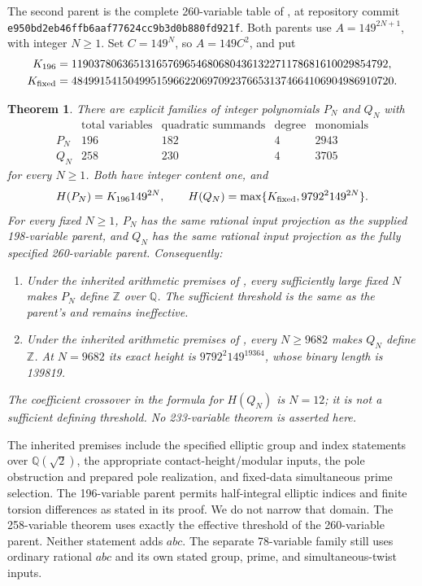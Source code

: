 \documentclass[11pt,a4paper]{article}
\newtheorem{theorem}{Theorem}[section]\newtheorem{lemma}[theorem]{Lemma}\newtheorem{proposition}[theorem]{Proposition}\newtheorem{corollary}[theorem]{Corollary}
\newcommand{\Q}{\mathbb Q}\newcommand{\Z}{\mathbb Z}\newcommand{\Nm}{\operatorname{N}}
\begin{document}
The second parent is the complete 260-variable table of \cite{Explicit}, at
repository commit \texttt{e950bd2eb46ffb6aaf77624cc9b3d0b880fd921f}.
Both parents use $A=149^{2N+1}$, with integer $N\ge1$.
Set $C=149^N$, so $A=149C^2$, and put
\begin{align*}
 K_{196}&=11903780636513165769654680680436132271178681610029854792,\\
 K_{\rm fixed}&=484991541504995159662206970923766531374664106904986910720.
\end{align*}

\begin{theorem}\label{thm:results}
There are explicit families of integer polynomials $P_N$ and $Q_N$ with
\[
\begin{array}{c|r|r|r|r}
 &\text{total variables}&\text{quadratic summands}&\text{degree}&\text{monomials}\\\hline
P_N&196&182&4&2943\\
Q_N&258&230&4&3705
\end{array}
\]
for every $N\ge1$. Both have integer content one, and
\[
 H(P_N)=K_{196}149^{2N},\qquad
 H(Q_N)=\max\{K_{\rm fixed},9792^2 149^{2N}\}.
\]
For every fixed $N\ge1$, $P_N$ has the same rational input projection as
the supplied 198-variable parent, and $Q_N$ has the same rational input
projection as the fully specified 260-variable parent. Consequently:
\begin{enumerate}
\item Under the inherited arithmetic premises of \cite{Archive198}, every
sufficiently large fixed $N$ makes $P_N$ define $\Z$ over $\Q$. The sufficient
threshold is the same as the parent's and remains ineffective.
\item Under the inherited arithmetic premises of \cite{Explicit}, every
$N\ge9682$ makes $Q_N$ define $\Z$. At $N=9682$ its exact height is
$9792^2 149^{19364}$, whose binary length is 139819.
\end{enumerate}
The coefficient crossover in the formula for $H(Q_N)$ is $N=12$; it is not a
sufficient defining threshold. No 233-variable theorem is asserted here.
\end{theorem}

The inherited premises include the specified elliptic group and index
statements over $\Q(\sqrt2)$, the appropriate contact-height/modular inputs,
the pole obstruction and prepared pole realization, and fixed-data
simultaneous prime selection. The 196-variable parent permits half-integral
elliptic indices and finite torsion differences as stated in its proof.
We do not narrow that domain. The 258-variable theorem uses exactly the
effective threshold of the 260-variable parent. Neither statement adds $abc$.
The separate 78-variable family \cite{ABC78} still uses ordinary rational
$abc$ and its own stated group, prime, and simultaneous-twist inputs.
\end{document}
